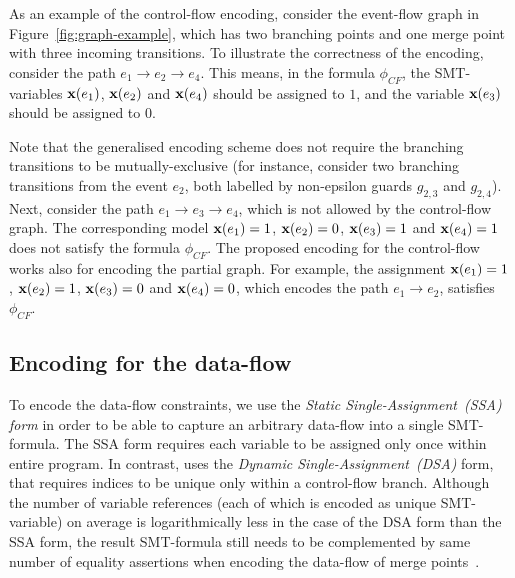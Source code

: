 As an example of the control-flow encoding, consider the event-flow graph in Figure~\ref{fig:graph-example}, which has two branching points and one merge point with three incoming transitions.
To illustrate the correctness of the encoding, consider the path $e_1 \rightarrow e_2 \rightarrow e_4$.
This means, in the formula $\phi_{CF}$, the SMT-variables $\mathbf{x}(e_1)$, $\mathbf{x}(e_2)$ and $\mathbf{x}(e_4)$ should be assigned to  $1$, and the variable $\mathbf{x}(e_3)$ should be assigned to $0$.

Note that the generalised encoding scheme does not require the branching transitions to be mutually-exclusive (for instance, consider two branching transitions from the event $e_2$, both labelled by non-epsilon guards $g_{2,3}$ and $g_{2,4}$).
Next, consider the path $e_1 \rightarrow e_3 \rightarrow e_4$, which is not allowed by the control-flow graph.
The corresponding model $\mathbf{x}(e_1)=1$, $\mathbf{x}(e_2)=0$, $\mathbf{x}(e_3)=1$ and $\mathbf{x}(e_4)=1$ does not satisfy the formula $\phi_{CF}$.
The proposed encoding for the control-flow works also for encoding the partial graph.
For example, the assignment $\mathbf{x}(e_1)=1$, $\mathbf{x}(e_2)=1$, $\mathbf{x}(e_3)=0$ and $\mathbf{x}(e_4)=0$, which encodes the path $e_1 \rightarrow e_2$, satisfies $\phi_{CF}$.

\subsection{Encoding for the data-flow}
\label{ch:enc:bmc:df}

To encode the data-flow constraints, we use the \textit{Static Single-Assignment~(SSA) form} in order to be able to capture an arbitrary data-flow into a single SMT-formula.
The SSA form requires each variable to be assigned only once within entire program.
In contrast, \porthos[1] uses the \textit{Dynamic Single-Assignment~(DSA)} form, that requires indices to be unique only within a control-flow branch.
Although the number of variable references (each of which is encoded as unique SMT-variable) on average is logarithmically less in the case of the DSA form than the SSA form, the result SMT-formula still needs to be complemented by same number of equality assertions when encoding the data-flow of merge points~\cite{Porthos17a}.

